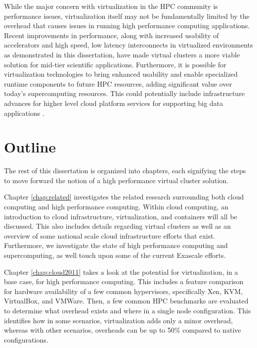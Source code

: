  
While the major concern with virtualization in the HPC community is performance issues, virtualization itself may not be fundamentally limited by the overhead that causes issues in running high performance computing applications. Recent improvements in performance, along with increased usability of accelerators and high speed, low latency interconnects in virtualized environments as demonstrated in this dissertation, have made virtual clusters a more viable solution for mid-tier scientific applications.  Furthermore, it is possible for  virtualization technologies to bring enhanced usability and enable specialized runtime components to future HPC resources, adding significant value over today's supercomputing resources.  This could potentially include infrastructure advances for higher level cloud platform services for supporting big data applications \cite{qiu2014towards}. 







\section{Outline}
\label{sec:outline}


The rest of this dissertation is organized into chapters, each signifying the steps to move forward the notion of a high performance virtual cluster solution.

Chapter \ref{chap:related} investigates the related research surrounding both cloud computing and high performance computing. Within cloud computing, an introduction to cloud infrastructure, virtualization, and containers will all be discussed. This also includes details regarding virtual clusters as well as an overview of some national scale cloud infrastructure efforts that exist. Furthermore, we investigate the state of high performance computing and supercomputing, as well touch upon some of the current Exascale efforts.

Chapter \ref{chap:cloud2011} takes a look at the potential for virtualization, in a base case, for high performance computing. This includes a feature comparison for hardware availability of a few common hypervisors, specifically Xen, KVM, VirtualBox, and VMWare. Then, a few common HPC benchmarks are evaluated to determine what overhead exists and where in a single node configuration. This identifies how in some scenarios, virtualization adds only a minor overhead, whereas with other scenarios, overheads can be up to 50\% compared to native configurations. 

